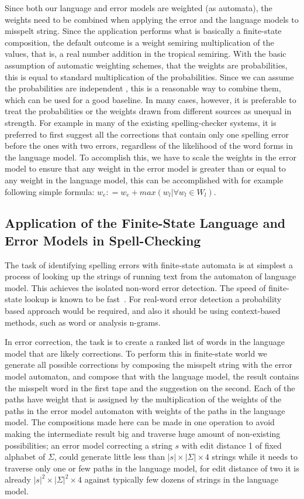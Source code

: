 \documentclass[a4paper,12pt]{article}
\begin{document}
Since both our language and error models are weighted (as automata), the
weights need to be combined when applying the error and the language models to
misspelt string. Since the application performs what is basically a
finite-state composition, the default outcome is a weight semiring
multiplication of the values, that is, a real number addition in the tropical
semiring. With the basic assumption of automatic weighting schemes, that the
weights are probabilities, this is equal to standard multiplication of the
probabilities. Since we can assume the probabilities are independent
\cite[]{church1991probability}, this is a reasonable way to combine them, which
can be used for a good baseline. In many cases, however, it is preferable to
treat the probabilities or the weights drawn from different sources as unequal
in strength. For example in many of the existing spelling-checker systems, it
is preferred to first suggest all the corrections that contain only one
spelling error before the ones  with two errors, regardless of the likelihood
of the word forms in the language model. To accomplish this, we have to scale
the weights in the error model to ensure that any weight in the error model is
greater than or equal to any weight in the language model, this can be
accomplished with for example following simple formula: $w_e
\mathrel{\mathop:}= w_e + max(w_l | \forall w_l \in W_l)$.

\subsection{Application of the Finite-State Language and Error Models in
Spell-Checking}

The task of identifying spelling errors with finite-state automata is at
simplest a process of looking up the strings of running text from the
automaton of language model. This achieves the isolated non-word error
detection. The speed of finite-state lookup is known to be fast~\cite{}.
For real-word error detection a probability based approach would be required,
and also it should be using context-based methods, such as word or analysis
n-grams.

In error correction, the task is to create a ranked list of words in the
language model that are likely corrections. To perform this in finite-state
world we generate all possible corrections by composing the misspelt string
with the error model automaton, and compose that with the language model, the
result contains the misspelt word in the first tape and the suggestion on the
second. Each of the paths have weight that is assigned by the multiplication of
the weights of the paths in the error model automaton with weights of the paths
in the language model. The compositions made here can be made in one
operation\cite{mohri,hfst/2012} to avoid making the intermediate result big and
traverse huge amount of non-existing possibilities; an error model correcting a
string $s$ with edit distance 1 of fixed alphabet of $\Sigma$, could generate
little less than $|s| \times |\Sigma| \times 4$ strings while it needs to
traverse only one or few paths in the language model, for edit distance of two
it is already $|s|^2 \times |\Sigma|^2 \times 4$ against typically few dozens
of strings in the language model.
\end{document}
